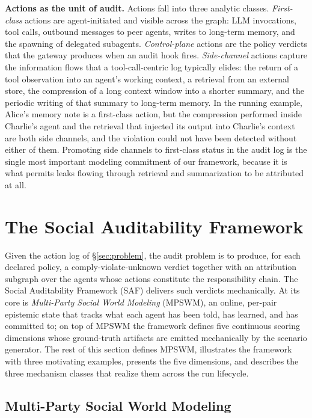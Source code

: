 \documentclass{article}
\begin{document}
\textbf{Actions as the unit of audit.} Actions fall into three analytic classes. \emph{First-class} actions are agent-initiated and visible across the graph: LLM invocations, tool calls, outbound messages to peer agents, writes to long-term memory, and the spawning of delegated subagents. \emph{Control-plane} actions are the policy verdicts that the gateway produces when an audit hook fires. \emph{Side-channel} actions capture the information flows that a tool-call-centric log typically elides: the return of a tool observation into an agent's working context, a retrieval from an external store, the compression of a long context window into a shorter summary, and the periodic writing of that summary to long-term memory. In the running example, Alice's memory note is a first-class action, but the compression performed inside Charlie's agent and the retrieval that injected its output into Charlie's context are both side channels, and the violation could not have been detected without either of them. Promoting side channels to first-class status in the audit log is the single most important modeling commitment of our framework, because it is what permits leaks flowing through retrieval and summarization to be attributed at all.

\section{The Social Auditability Framework}
\label{sec:saf}

Given the action log of \S\ref{sec:problem}, the audit problem is to produce, for each declared policy, a comply-violate-unknown verdict together with an attribution subgraph over the agents whose actions constitute the responsibility chain. The Social Auditability Framework (SAF) delivers such verdicts mechanically. At its core is \emph{Multi-Party Social World Modeling} (MPSWM), an online, per-pair epistemic state that tracks what each agent has been told, has learned, and has committed to; on top of MPSWM the framework defines five continuous scoring dimensions whose ground-truth artifacts are emitted mechanically by the scenario generator. The rest of this section defines MPSWM, illustrates the framework with three motivating examples, presents the five dimensions, and describes the three mechanism classes that realize them across the run lifecycle.

\subsection{Multi-Party Social World Modeling}
\label{sec:saf:mpswm}
\end{document}
